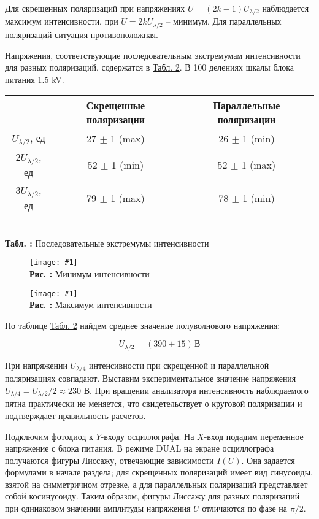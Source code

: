 \documentclass[12pt,a4paper]{article}
\newcounter{picture}
\newcounter{tbl}
\newcommand{\embed}[3]{\begin{center}
		\texttt{[image: \#1]}
		\\\textbf{Рис. \thepicture:} #3
		\label{pic_\thepicture}
		\addtocounter{picture}{1}
\end{center}}
\newcommand{\embedtbl}[3]{\begin{center}
		\begin{tabular}{#1}
			#2
		\end{tabular}
		\\\textbf{Табл. \thetbl:} #3
		\label{tbl_\thetbl}
		\addtocounter{tbl}{1}
\end{center}}
\newcommand{\tblref}[1]{\hyperref[tbl_#1]{Табл. #1}}
\begin{document}
	Для скрещенных поляризаций при напряжениях $U = (2k - 1)U_{\lambda/2}$ наблюдается максимум интенсивности, при $U = 2kU_{\lambda/2}$ -- минимум. Для параллельных поляризаций ситуация противоположная.
	
	Напряжения, соответствующие последовательным экстремумам интенсивности для разных поляризаций, содержатся в \tblref{2}.	В 100 делениях шкалы блока питания 1.5 kV. 
	
	\embedtbl{|c|c|c|}{
		\hline
		& Скрещенные поляризации & Параллельные поляризации
		\\\hline
		$U_{\lambda/2}$, ед & 27 $\pm$ 1 (max) & 26 $\pm$ 1 (min)
		\\\hline
		$2U_{\lambda/2}$, ед & 52 $\pm$ 1 (min) & 52 $\pm$ 1 (max)
		\\\hline
		$3U_{\lambda/2}$, ед & 79 $\pm$ 1 (max) & 78 $\pm$ 1 (min)
		\\\hline
	
	}{Последовательные экстремумы интенсивности}
	
	\begin{figure}[h]
		\begin{minipage}{0.5\linewidth}
			\embed{PIC_6.png}{0.15}{Минимум интенсивности}
		\end{minipage}
		\begin{minipage}{0.5\linewidth}
			\embed{PIC_7.png}{0.15}{Максимум интенсивности}
		\end{minipage}
	\end{figure}
	
	По таблице \tblref{2} найдем среднее значение полуволнового напряжения: 
	
	$$ U_{\lambda/2} = (390 \pm 15)\,\text{В} $$ 
	
	При напряжении $U_{\lambda/4}$ интенсивности при скрещенной и параллельной поляризациях совпадают. Выставим экспериментальное значение напряжения $U_{\lambda/4} = U_{\lambda/2}/2 \approx 230$ В. При вращении анализатора интенсивность наблюдаемого пятна практически не меняется, что свидетельствует о круговой поляризации и подтверждает правильность расчетов.  
	
	Подключим фотодиод к $Y$-входу осциллографа. На $X$-вход подадим переменное напряжение с блока питания. В режиме DUAL на экране осциллографа получаются фигуры Лиссажу, отвечающие зависимости $I(U)$. Она задается формулами в начале раздела; для скрещенных поляризаций имеет вид синусоиды, взятой на симметричном отрезке, а для параллельных поляризаций представляет собой косинусоиду. Таким образом, фигуры Лиссажу для разных поляризаций при одинаковом значении амплитуды напряжения $U$ отличаются по фазе на $\pi/2$.
	
\end{document}
